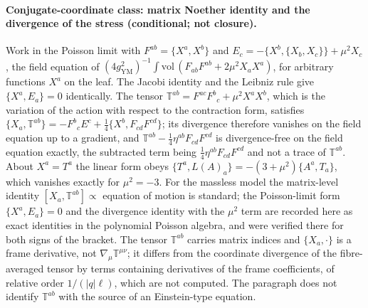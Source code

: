 \paragraph{Conjugate-coordinate class: matrix Noether identity and the divergence of the stress (conditional; not closure).}
Work in the Poisson limit with \(F^{ab}=\{X^a,X^b\}\) and \(E_c=-\{X^b,\{X_b,X_c\}\}+\mu^2X_c\), the field equation of \((4g_{\mathrm{YM}}^2)^{-1}\int\mathrm{vol}\,(F_{ab}F^{ab}+2\mu^2X_aX^a)\), for arbitrary functions \(X^a\) on the leaf. The Jacobi identity and the Leibniz rule give \(\{X^a,E_a\}=0\) identically. The tensor \(\mathbb T^{ab}=F^{ac}F^{b}{}_{c}+\mu^2X^aX^b\), which is the variation of the action with respect to the contraction form, satisfies \(\{X_a,\mathbb T^{ab}\}=-F^{b}{}_{c}E^c+\tfrac14\{X^b,F_{cd}F^{cd}\}\); its divergence therefore vanishes on the field equation up to a gradient, and \(\mathbb T^{ab}-\tfrac14\eta^{ab}F_{cd}F^{cd}\) is divergence-free on the field equation exactly, the subtracted term being \(\tfrac14\eta^{ab}F_{cd}F^{cd}\) and not a trace of \(\mathbb T^{ab}\). About \(X^a=T^a\) the linear form obeys \(\{T^a,L(A)_a\}=-(3+\mu^2)\{A^a,T_a\}\), which vanishes exactly for \(\mu^2=-3\). For the massless model the matrix-level identity \([X_a,\mathbb T^{ab}]\propto\) equation of motion is standard; the Poisson-limit form \(\{X^a,E_a\}=0\) and the divergence identity with the \(\mu^2\) term are recorded here as exact identities in the polynomial Poisson algebra, and were verified there for both signs of the bracket. The tensor \(\mathbb T^{ab}\) carries matrix indices and \(\{X_a,\cdot\}\) is a frame derivative, not \(\nabla_\mu\mathbb T^{\mu\nu}\); it differs from the coordinate divergence of the fibre-averaged tensor by terms containing derivatives of the frame coefficients, of relative order \(1/(|q|\ell)\), which are not computed. The paragraph does not identify \(\mathbb T^{ab}\) with the source of an Einstein-type equation.

